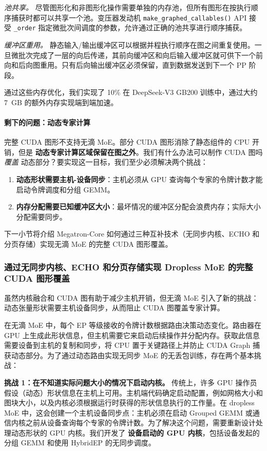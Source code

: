 \textit{池共享。}
尽管图形化和非图形化操作需要单独的内存池，但所有图形在按执行顺序捕获时都可以共享一个池。变压器发动机 \texttt{make\_graphed\_callables()} API 接受 \texttt{\_order} 指定微批次间调度的参数，允许通过正确的池共享进行顺序捕获。

\textit{缓冲区重用。}
静态输入/输出缓冲区可以根据并程执行顺序在图之间重复使用。一旦微批次完成了一层的向后传递，其前向缓冲区和向后输入缓冲区就可供下一个前向和后向图重用。只有后向输出缓冲区必须保留，直到数据发送到下一个 PP 阶段。

通过这些内存优化，我们实现了 10\% 在 DeepSeek-V3 GB200 训练中，通过大约 7~GB 的额外内存实现端到端加速。

\paragraph{剩下的问题：动态专家计算}

完整 CUDA 图形不支持无滴 MoE。部分 CUDA 图形消除了静态组件的 CPU 开销，但是 \textbf{动态专家计算区域保留在图之外}。我们有什么办法可以制作 CUDA 图吗 \textit{覆盖} 动态部分？要实现这一目标，我们至少必须解决两个挑战：
\begin{enumerate}
    \item \textbf{动态形状需要主机-设备同步}：主机必须从 GPU 查询每个专家的令牌计数才能启动令牌调度和分组 GEMM。
    \item \textbf{内存分配需要已知缓冲区大小}：最坏情况的缓冲区分配会浪费内存；实际大小分配需要同步。
\end{enumerate}

下一小节将介绍 Megatron-Core 如何通过三种互补技术（无同步内核、ECHO 和分页存储）实现无滴 MoE 的完整 CUDA 图形覆盖。

\subsubsection{通过无同步内核、ECHO 和分页存储实现 Dropless MoE 的完整 CUDA 图形覆盖}\label{sec:sync-free-moe}

虽然内核融合和 CUDA 图有助于减少主机开销，但无滴 MoE 引入了新的挑战：动态张量形状需要主机设备同步，从而阻止 CUDA 图覆盖专家计算。

在无滴 MoE 中，每个 EP 等级接收的令牌计数根据路由决策动态变化。路由器在 GPU 上生成此形状信息，但主机需要它来启动后续操作并分配内存。获取此信息需要设备到主机的复制和同步，将 CPU 置于关键路径上并防止 CUDA Graph 捕获动态部分。为了通过动态路由实现无同步 MoE 的无丢包训练，存在两个基本挑战：

\textbf{挑战 1：在不知道实际问题大小的情况下启动内核。}
传统上，许多 GPU 操作员假设（动态）形状信息在主机上可用。主机端代码确定启动配置，例如网格大小和图块大小，以及内核必须根据运行时获得的形状信息执行的工作量。在 dropless MoE 中，这会创建一个主机设备同步点：主机必须在启动 Grouped GEMM 或通信内核之前从设备查询每个专家的令牌计数。为了解决这个问题，需要重新设计处理动态形状的 GPU 内核。我们开发了 \textbf{设备启动的 GPU 内核}，包括设备发起的分组 GEMM 和使用 HybridEP 的无同步调度。


